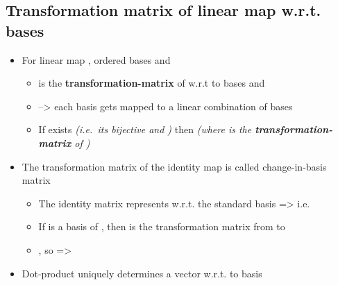 \subsection*{Transformation matrix of linear map w.r.t.
  bases}

\begin{itemize}

  \item
        For linear map , ordered bases
        and

        \begin{itemize}

          \item
                 is the
                \textbf{transformation-matrix} of  w.r.t to bases 
                and 
          \item
                --> each  basis gets mapped to a
                linear combination of  bases
          \item
                If  exists \emph{(i.e.~its bijective and )}
                then 
                \emph{(where  is the
                  \textbf{transformation-matrix} of )}
        \end{itemize}
  \item
        The transformation matrix of the identity map is called
        change-in-basis matrix

        \begin{itemize}

          \item
                The identity matrix  represents
                 w.r.t. the standard
                basis
                => i.e.~
          \item
                If 
                is a basis of , then
                 is
                the transformation matrix from  to 
          \item
                , so =>
        \end{itemize}
  \item
        Dot-product uniquely determines a vector w.r.t. to basis


\end{itemize}

